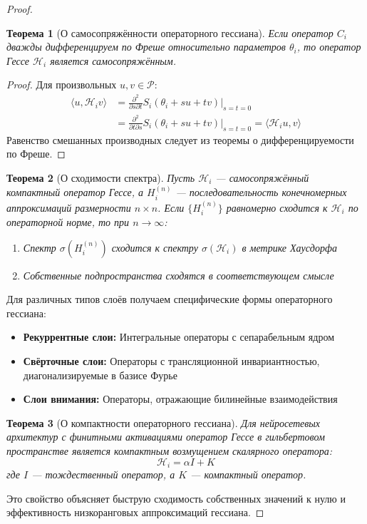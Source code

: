\documentclass[a4paper,12pt]{article}
\newtheorem{theorem}{Теорема}
\begin{document}
\begin{proof}
    \begin{theorem}[О самосопряжённости операторного гессиана]
    Если оператор $C_i$ дважды дифференцируем по Фреше относительно параметров $\theta_i$, то оператор Гессе $\mathcal{H}_i$ является самосопряжённым.
    \end{theorem}
    
    \begin{proof}
    Для произвольных $u, v \in \mathcal{P}$:
    \begin{align}
    \langle u, \mathcal{H}_i v \rangle &= \frac{\partial^2}{\partial s \partial t} S_i(\theta_i + su + tv) \bigg|_{s=t=0} \\
    &= \frac{\partial^2}{\partial t \partial s} S_i(\theta_i + su + tv) \bigg|_{s=t=0} = \langle \mathcal{H}_i u, v \rangle
    \end{align}
    Равенство смешанных производных следует из теоремы о дифференцируемости по Фреше.
    \end{proof}
    
    \begin{theorem}[О сходимости спектра]
    Пусть $\mathcal{H}_i$ — самосопряжённый компактный оператор Гессе, а $H_i^{(n)}$ — последовательность конечномерных аппроксимаций размерности $n \times n$. Если $\{H_i^{(n)}\}$ равномерно сходится к $\mathcal{H}_i$ по операторной норме, то при $n \to \infty$:
    \begin{enumerate}
    \item Спектр $\sigma(H_i^{(n)})$ сходится к спектру $\sigma(\mathcal{H}_i)$ в метрике Хаусдорфа
    \item Собственные подпространства сходятся в соответствующем смысле
    \end{enumerate}
    \end{theorem}
    
    Для различных типов слоёв получаем специфические формы операторного гессиана:
    \begin{itemize}
    \item \textbf{Рекуррентные слои:} Интегральные операторы с сепарабельным ядром
    \item \textbf{Свёрточные слои:} Операторы с трансляционной инвариантностью, диагонализируемые в базисе Фурье
    \item \textbf{Слои внимания:} Операторы, отражающие билинейные взаимодействия
    \end{itemize}
    
    \begin{theorem}[О компактности операторного гессиана]
    Для нейросетевых архитектур с финитными активациями оператор Гессе в гильбертовом пространстве является компактным возмущением скалярного оператора:
    \begin{equation}
    \mathcal{H}_i = \alpha I + K
    \end{equation}
    где $I$ — тождественный оператор, а $K$ — компактный оператор.
    \end{theorem}
    
    Это свойство объясняет быструю сходимость собственных значений к нулю и эффективность низкоранговых аппроксимаций гессиана.
    \end{proof}
    
\end{document}
